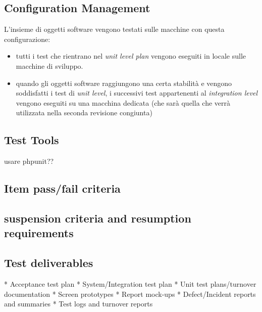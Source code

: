 \subsection{Configuration Management}
L'insieme di oggetti software vengono testati sulle macchine con questa
configurazione:
\begin{itemize}
  \item tutti i test che rientrano nel \emph{unit level plan} vengono eseguiti
  in locale sulle macchine di sviluppo.
  \item quando gli oggetti software raggiungono una certa stabilit\`a e vengono
  soddisfatti i test di \emph{unit level}, i successivi test appartenenti al
  \emph{integration level} vengono eseguiti su una macchina dedicata (che
  sar\`a quella che verr\`a utilizzata nella seconda revisione congiunta)
\end{itemize}

\subsection{Test Tools}
usare phpunit??

\subsection{Item pass/fail criteria}
\subsection{suspension criteria and resumption requirements}
\subsection{Test deliverables}
    * Acceptance test plan
    * System/Integration test plan
    * Unit test plans/turnover documentation
    * Screen prototypes
    * Report mock-ups
    * Defect/Incident reports and summaries
    * Test logs and turnover reports
